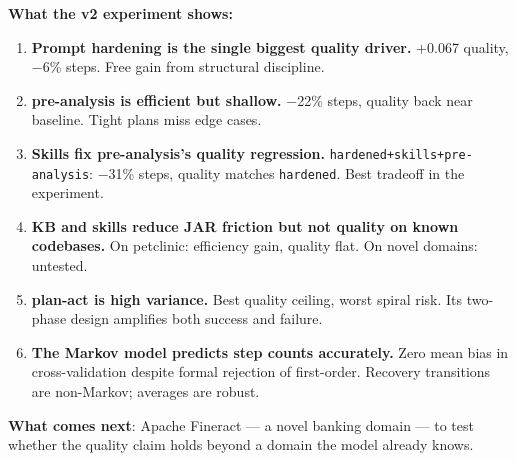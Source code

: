 \documentclass[11pt,a4paper]{article}
\begin{document}
\begin{keybox}
\textbf{What the v2 experiment shows:}

\begin{enumerate}[leftmargin=1.5em,itemsep=4pt]
  \item \textbf{Prompt hardening is the single biggest quality driver.}
    $+$0.067 quality, $-$6\% steps. Free gain from structural discipline.

  \item \textbf{pre-analysis is efficient but shallow.}
    $-$22\% steps, quality back near baseline.
    Tight plans miss edge cases.

  \item \textbf{Skills fix pre-analysis's quality regression.}
    \texttt{hardened+skills+pre-analysis}: $-$31\% steps, quality matches \texttt{hardened}.
    Best tradeoff in the experiment.

  \item \textbf{KB and skills reduce JAR friction but not quality on known codebases.}
    On petclinic: efficiency gain, quality flat.
    On novel domains: untested.

  \item \textbf{plan-act is high variance.}
    Best quality ceiling, worst spiral risk.
    Its two-phase design amplifies both success and failure.

  \item \textbf{The Markov model predicts step counts accurately.}
    Zero mean bias in cross-validation despite formal rejection of first-order.
    Recovery transitions are non-Markov; averages are robust.
\end{enumerate}

\vspace{6pt}
\textbf{What comes next}: Apache Fineract --- a novel banking domain ---
to test whether the quality claim holds beyond a domain the model already knows.
\end{keybox}
\end{document}
